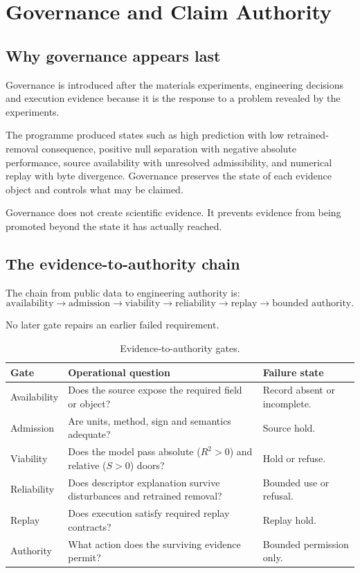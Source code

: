 \documentclass[11pt,a4paper,oneside]{report}
\begin{document}
\chapter{Governance and Claim Authority}
\label{chap:governance}

\section{Why governance appears last}
Governance is introduced after the materials experiments, engineering decisions and execution evidence because it is the response to a problem revealed by the experiments.

The programme produced states such as high prediction with low retrained-removal consequence, positive null separation with negative absolute performance, source availability with unresolved admissibility, and numerical replay with byte divergence. Governance preserves the state of each evidence object and controls what may be claimed.

\begin{governingrule}
Governance does not create scientific evidence. It prevents evidence from being promoted beyond the state it has actually reached.
\end{governingrule}

\section{The evidence-to-authority chain}
The chain from public data to engineering authority is:
\begin{equation}
\text{availability} \rightarrow \text{admission} \rightarrow \text{viability} \rightarrow \text{reliability} \rightarrow \text{replay} \rightarrow \text{bounded authority}.
\end{equation}

No later gate repairs an earlier failed requirement.

\begin{table}[H]
\centering
\caption{Evidence-to-authority gates.}
\label{tab:authority-gates}
\begin{tabularx}{\textwidth}{L{0.18\textwidth}YY}
\toprule
\textbf{Gate} & \textbf{Operational question} & \textbf{Failure state} \\
\midrule
Availability & Does the source expose the required field or object? & Record absent or incomplete. \\
Admission & Are units, method, sign and semantics adequate? & Source hold. \\
Viability & Does the model pass absolute ($R^2>0$) and relative ($S>0$) doors? & Hold or refuse. \\
Reliability & Does descriptor explanation survive disturbances and retrained removal? & Bounded use or refusal. \\
Replay & Does execution satisfy required replay contracts? & Replay hold. \\
Authority & What action does the surviving evidence permit? & Bounded permission only. \\
\bottomrule
\end{tabularx}
\end{table}
\end{document}
